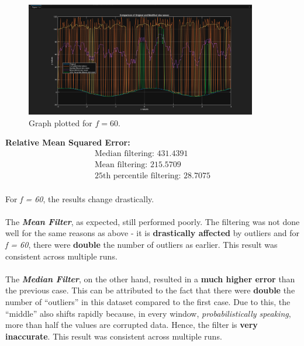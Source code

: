 \documentclass{report}
\begin{document}
\begin{figure}[h]
    \centering
    \includegraphics[width=0.9\textwidth]{f60_filtered.png}
    \caption{Graph plotted for $f = 60$.}
    \label{fig:f30}
\end{figure}


\vspace{1em} %
\noindent\textbf{Relative Mean Squared Error:}
\begin{align*}
\text{Median filtering: } 431.4391 \\
\text{Mean filtering: } 215.5709 \\
\text{25th percentile filtering: } 28.7075
\end{align*}\\

For \textit{f = 60}, the results change drastically.

\paragraph{} The \textbf{\textit{Mean Filter}}, as expected, still performed poorly. The filtering was not done well for the same reasons as above - it is \textbf{drastically affected} by outliers and for \textit{f = 60}, there were \textbf{double} the number of outliers as earlier. This result was consistent across multiple runs.

\paragraph{} The \textbf{\textit{Median Filter}}, on the other hand, resulted in a \textbf{much higher error} than the previous case. This can be attributed to the fact that there were \textbf{double} the number of “outliers” in this dataset compared to the first case. Due to this, the “middle” also shifts rapidly because, in every window, \textit{probabilistically speaking}, more than half the values are corrupted data. Hence, the filter is \textbf{very inaccurate}. This result was consistent across multiple runs.
\end{document}
